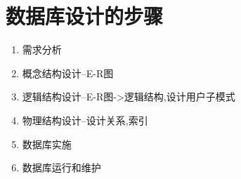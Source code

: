 \section{数据库设计的步骤}
\begin{enumerate}
    \item 需求分析
    \item 概念结构设计--E-R图
    \item 逻辑结构设计--E-R图->逻辑结构,设计用户子模式
    \item 物理结构设计--设计关系,索引
    \item 数据库实施
    \item 数据库运行和维护
\end{enumerate}